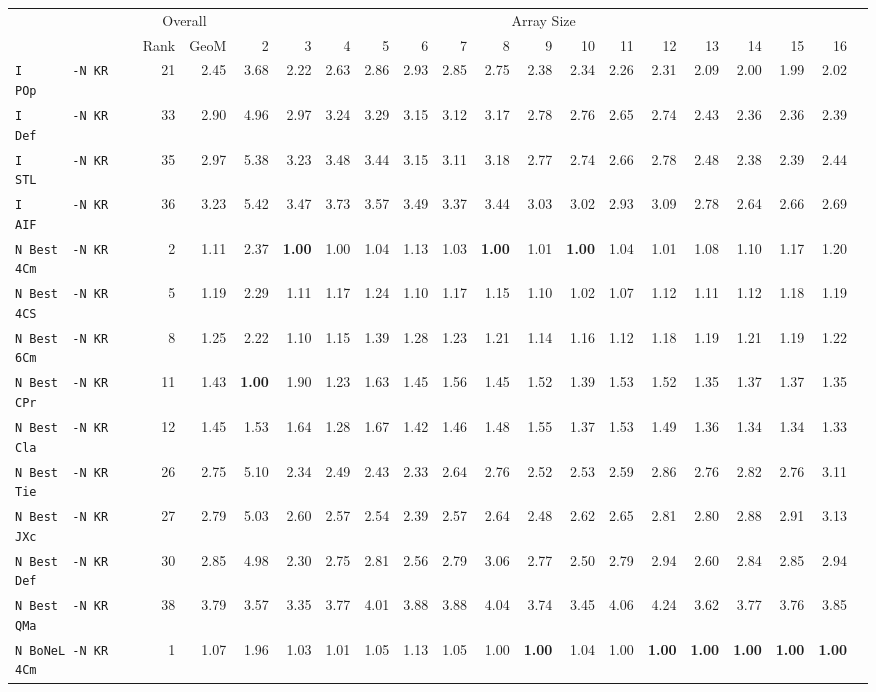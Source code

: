 \begin{tabular}{l | r @{~~} r | r@{~~}r@{~~}r@{~~}r@{~~}r@{~~}r@{~~}r@{~~}r@{~~}r@{~~}r@{~~}r@{~~}r@{~~}r@{~~}r@{~~}r@{~~}r|}
 & \multicolumn{2}{c|}{Overall} & \multicolumn{15}{c}{Array Size} \\
 & Rank & GeoM & 2&3&4&5&6&7&8&9&10&11&12&13&14&15&16\\ \hline
\verb+I       -N KR POp+ & 21 & 2.45 & 3.68&2.22&2.63&2.86&2.93&2.85&2.75&2.38&2.34&2.26&2.31&2.09&2.00&1.99&2.02\\
\verb+I       -N KR Def+ & 33 & 2.90 & 4.96&2.97&3.24&3.29&3.15&3.12&3.17&2.78&2.76&2.65&2.74&2.43&2.36&2.36&2.39\\
\verb+I       -N KR STL+ & 35 & 2.97 & 5.38&3.23&3.48&3.44&3.15&3.11&3.18&2.77&2.74&2.66&2.78&2.48&2.38&2.39&2.44\\
\verb+I       -N KR AIF+ & 36 & 3.23 & 5.42&3.47&3.73&3.57&3.49&3.37&3.44&3.03&3.02&2.93&3.09&2.78&2.64&2.66&2.69\smallskip \\
\verb+N Best  -N KR 4Cm+ & 2 & 1.11 & 2.37&\textbf{1.00}&1.00&1.04&1.13&1.03&\textbf{1.00}&1.01&\textbf{1.00}&1.04&1.01&1.08&1.10&1.17&1.20\\
\verb+N Best  -N KR 4CS+ & 5 & 1.19 & 2.29&1.11&1.17&1.24&1.10&1.17&1.15&1.10&1.02&1.07&1.12&1.11&1.12&1.18&1.19\\
\verb+N Best  -N KR 6Cm+ & 8 & 1.25 & 2.22&1.10&1.15&1.39&1.28&1.23&1.21&1.14&1.16&1.12&1.18&1.19&1.21&1.19&1.22\\
\verb+N Best  -N KR CPr+ & 11 & 1.43 & \textbf{1.00}&1.90&1.23&1.63&1.45&1.56&1.45&1.52&1.39&1.53&1.52&1.35&1.37&1.37&1.35\\
\verb+N Best  -N KR Cla+ & 12 & 1.45 & 1.53&1.64&1.28&1.67&1.42&1.46&1.48&1.55&1.37&1.53&1.49&1.36&1.34&1.34&1.33\\
\verb+N Best  -N KR Tie+ & 26 & 2.75 & 5.10&2.34&2.49&2.43&2.33&2.64&2.76&2.52&2.53&2.59&2.86&2.76&2.82&2.76&3.11\\
\verb+N Best  -N KR JXc+ & 27 & 2.79 & 5.03&2.60&2.57&2.54&2.39&2.57&2.64&2.48&2.62&2.65&2.81&2.80&2.88&2.91&3.13\\
\verb+N Best  -N KR Def+ & 30 & 2.85 & 4.98&2.30&2.75&2.81&2.56&2.79&3.06&2.77&2.50&2.79&2.94&2.60&2.84&2.85&2.94\\
\verb+N Best  -N KR QMa+ & 38 & 3.79 & 3.57&3.35&3.77&4.01&3.88&3.88&4.04&3.74&3.45&4.06&4.24&3.62&3.77&3.76&3.85\smallskip \\
\verb+N BoNeL -N KR 4Cm+ & 1 & 1.07 & 1.96&1.03&1.01&1.05&1.13&1.05&1.00&\textbf{1.00}&1.04&1.00&\textbf{1.00}&\textbf{1.00}&\textbf{1.00}&\textbf{1.00}&\textbf{1.00}\\

\end{tabular}
